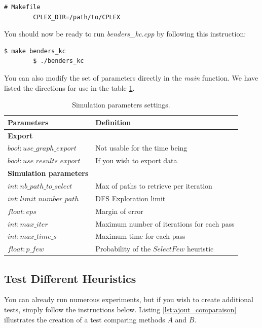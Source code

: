 \documentclass[12pt, a4paper, twoside]{article}
\numberwithin{equation}{section}
\begin{document}
    \begin{lstlisting}[style=terminal]
		# Makefile
		CPLEX_DIR=/path/to/CPLEX
	\end{lstlisting}

    \noindent You should now be ready to run \textit{benders\_kc.cpp} by following this instruction:
	
	\begin{lstlisting}[style=terminal]
		$ make benders_kc
		$ ./benders_kc
	\end{lstlisting}

    \noindent You can also modify the set of parameters directly in the \textit{main} function. We have listed the directions for use in the table \ref{tb:an:parametres_cpp}.
	
	\begin{table}[H]
	    \centering
	    \begin{tabular}{l l}
            \toprule
            Parameters & Definition\\
            \midrule
            \textbf{Export} & \\
            $bool: use\_graph\_export$ & Not usable for the time being\\
            $bool: use\_results\_export$ & If you wish to export data\\
            \textbf{Simulation parameters} & \\
            $int: nb\_path\_to\_select$ & Max of paths to retrieve per iteration\\
            $int: limit\_number\_path$ & DFS Exploration limit\\
            $float: eps$ & Margin of error\\
            $int: max\_iter$ & Maximum number of iterations for each pass\\
            $int: max\_time\_s$ & Maximum time for each pass\\
            $float: p\_few$ & Probability of the $SelectFew$ heuristic\\
            \bottomrule
	    \end{tabular}
	    \caption{Simulation parameters settings.}
	    \label{tb:an:parametres_cpp}
	\end{table}
	
	\subsection{Test Different Heuristics}

    \noindent You can already run numerous experiments, but if you wish to create additional tests, simply follow the instructions below. Listing \ref{lst:ajout_comparaison} illustrates the creation of a test comparing methods $A$ and $B$.
    
\end{document}
